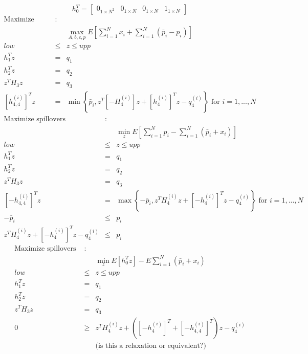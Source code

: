 \documentclass{article}
\begin{document}
\begin{equation*}
h_{0}^{T}=\left[ 
\begin{array}{cccc}
0_{1\times N^{2}} & 0_{1\times N} & 0_{1\times N} & 1_{1\times N}%
\end{array}%
\right] 
\end{equation*}%
\begin{eqnarray*}
\text{Maximize spillovers} &\text{:}& \\
&&\max_{A,b,c,p}E\left[ \sum_{i=1}^{N}x_{i}+\sum_{i=1}^{N}\left( \bar{p}%
_{i}-p_{i}\right) \right]  \\
low &\leq &z\leq upp \\
h_{1}^{T}z &=&q_{1} \\
h_{2}^{T}z &=&q_{2} \\
z^{T}H_{3}z &=&q_{3} \\
\left[ h_{4,4}^{\left( i\right) }\right] ^{T}z &=&\min \left\{ \bar{p}%
_{i},z^{T}\left[ -H_{4}^{\left( i\right) }\right] z+\left[ h_{4}^{\left(
i\right) }\right] ^{T}z-q_{4}^{\left( i\right) }\right\} \text{ for }%
i=1,...,N
\end{eqnarray*}%
\begin{eqnarray*}
\text{Maximize spillovers} &\text{:}& \\
&&\min_{z}E\left[ \sum_{i=1}^{N}p_{i}-\sum_{i=1}^{N}\left( \bar{p}%
_{i}+x_{i}\right) \right]  \\
low &\leq &z\leq upp \\
h_{1}^{T}z &=&q_{1} \\
h_{2}^{T}z &=&q_{2} \\
z^{T}H_{3}z &=&q_{3} \\
\left[ -h_{4,4}^{\left( i\right) }\right] ^{T}z &=&\max \left\{ -\bar{p}%
_{i},z^{T}H_{4}^{\left( i\right) }z+\left[ -h_{4}^{\left( i\right) }\right]
^{T}z-q_{4}^{\left( i\right) }\right\} \text{ for }i=1,...,N \\
-\bar{p}_{i} &\leq &p_{i} \\
z^{T}H_{4}^{\left( i\right) }z+\left[ -h_{4}^{\left( i\right) }\right]
^{T}z-q_{4}^{\left( i\right) } &\leq &p_{i}
\end{eqnarray*}%
\begin{eqnarray*}
\text{Maximize spillovers } &\text{:}& \\
&&\min_{z}E\left[ h_{0}^{T}z\right] -E\sum_{i=1}^{N}\left( \bar{p}%
_{i}+x_{i}\right)  \\
low &\leq &z\leq upp \\
h_{1}^{T}z &=&q_{1} \\
h_{2}^{T}z &=&q_{2} \\
z^{T}H_{3}z &=&q_{3} \\
0 &\geq &z^{T}H_{4}^{\left( i\right) }z+\left( \left[ -h_{4}^{\left(
i\right) }\right] ^{T}+\left[ -h_{4,4}^{\left( i\right) }\right] ^{T}\right)
z-q_{4}^{\left( i\right) } \\
&&\text{(is this a relaxation or equivalent?)}
\end{eqnarray*}%
\end{document}
